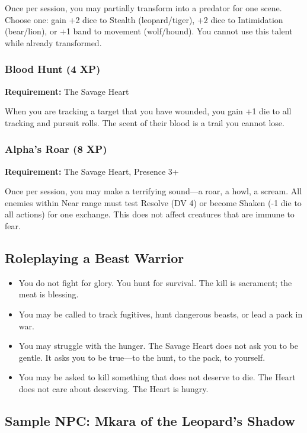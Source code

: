 Once per session, you may partially transform into a predator for one scene. Choose one: gain +2 dice to Stealth (leopard/tiger), +2 dice to Intimidation (bear/lion), or +1 band to movement (wolf/hound). You cannot use this talent while already transformed.

\subsubsection{Blood Hunt (4 XP)}

\textbf{Requirement:} The Savage Heart

When you are tracking a target that you have wounded, you gain +1 die to all tracking and pursuit rolls. The scent of their blood is a trail you cannot lose.

\subsubsection{Alpha's Roar (8 XP)}

\textbf{Requirement:} The Savage Heart, Presence 3+

Once per session, you may make a terrifying sound—a roar, a howl, a scream. All enemies within Near range must test Resolve (DV 4) or become Shaken (-1 die to all actions) for one exchange. This does not affect creatures that are immune to fear.

\subsection{Roleplaying a Beast Warrior}

\begin{itemize}
\item You do not fight for glory. You hunt for survival. The kill is sacrament; the meat is blessing.
\item You may be called to track fugitives, hunt dangerous beasts, or lead a pack in war.
\item You may struggle with the hunger. The Savage Heart does not ask you to be gentle. It asks you to be true—to the hunt, to the pack, to yourself.
\item You may be asked to kill something that does not deserve to die. The Heart does not care about deserving. The Heart is hungry.
\end{itemize}

\subsection{Sample NPC: Mkara of the Leopard's Shadow}

